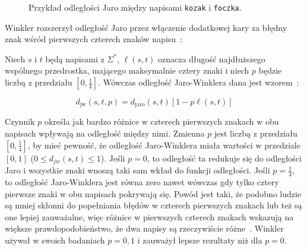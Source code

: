\documentclass{praca1}
\begin{document}
\begin{figure}[width=80pt]
\centering
{}
\cprotect\caption{Przykład odległości Jaro między napisami \verb|kozak| i \verb|foczka|.}\label{rys:005}
\end{figure}


Winkler rozszerzył odległość Jaro przez włączenie dodatkowej kary za błędny znak wśród pierwszych czterech znaków napisu~\cite{Loo2014:stringdist}:

\begin{definition}
Niech $s$ i $t$ będą napisami z $\Sigma^*$, $\ell(s,t)$ oznacza długość najdłuższego wspólnego przedrostka, mającego maksymalnie cztery znaki i niech $p$ będzie liczbą z przedziału $[0, \frac{1}{4}]$. Wówczas odległość Jaro-Winklera dana jest wzorem~\cite{Winkler1990:stringcomparator}:

\begin{equation}
\label{eq:012}
d_{\mathrm{jw}}(s,t, p) = d_{\mathrm{jaro}}(s,t)[1 - p\ell(s,t)]
\end{equation}
\end{definition}

Czynnik $p$ określa jak bardzo różnice w czterech pierwszych znakach w obu napisach wpływają na odległość między nimi. Zmienna $p$ jest liczbą z przedziału $[0, \frac{1}{4}]$, by mieć pewność, że odległość Jaro-Winklera miała wartości w przedziale $[0,1]$ ($0 \leq d_{jw}(s,t) \leq 1$). Jeśli $p=0$, to odległość ta redukuje się do odległości Jaro i wszystkie znaki wnoszą taki sam wkład do funkcji odległości. Jeśli $p = \frac{1}{4}$, to odległość Jaro-Winklera jest równa zero nawet wówczas gdy tylko cztery pierwsze znaki w obu napisach pokrywają się. Powód jest taki, że podobno ludzie są mniej skłonni do popełniania błędów w czterech pierwszych znakach lub też są one lepiej zauważalne, więc różnice w pierwszych czterech znakach wskazują na większe prawdopodobieństwo, że dwa napisy są rzeczywiście różne~\cite{Loo2014:stringdist}. Winkler~\cite{Winkler1990:stringcomparator} używał w swoich badaniach $p = 0,1$ i zauważył lepsze rezultaty niż dla $p = 0$.
\end{document}
